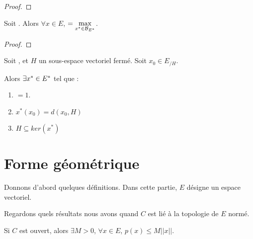\begin{proof}
	
\end{proof}

\begin{corollary}
	Soit . Alors $\forall x \in E$,  
	$ = \max\limits_{x^{*} \in \mathcal{B}_{E^{*}}}$.
\end{corollary}

\begin{proof}
	
\end{proof}

\begin{corollary}
	Soit , et $H$ un sous-espace vectoriel fermé.
	Soit $x_{0} \in E_{/H}$.

	Alors $\exists x^{*} \in E^{*}$ tel que :

	\begin{enumerate}
		\item {} $ = 1$.
		\item $x^{*}(x_{0}) = d(x_{0}, H)$
		\item $H \subseteq ker(x^{*})$
	\end{enumerate}
\end{corollary}

\section{Forme géométrique}

Donnons d'abord quelques définitions. Dans cette partie, $E$ désigne un espace
vectoriel.



Regardons quels résultats nous avons quand $C$ est lié à la topologie de $E$
normé.

\begin{proposition}
	Si $C$ est ouvert, alors $\exists M > 0$, $\forall x \in E$, $p(x) \leq M
	||x||$.
\end{proposition}

